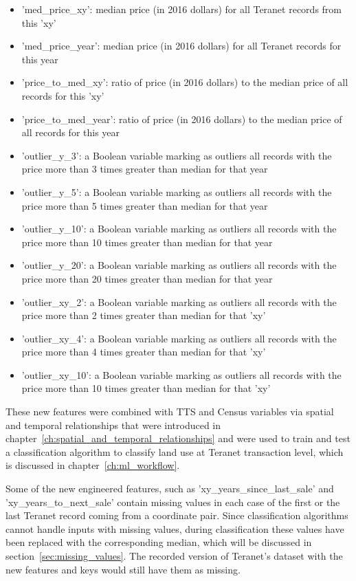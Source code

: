 \begin{itemize}
    \item 'med\_price\_xy': median price (in 2016 dollars) for all Teranet records from this 'xy'
    \item 'med\_price\_year': median price (in 2016 dollars) for all Teranet records for this year
    \item 'price\_to\_med\_xy': ratio of price (in 2016 dollars) to the median price of all records for this 'xy'
    \item 'price\_to\_med\_year': ratio of price (in 2016 dollars) to the median price of all records for this year
    \item 'outlier\_y\_3': a Boolean variable marking as outliers all records with the price more than 3 times greater than median for that year
    \item 'outlier\_y\_5': a Boolean variable marking as outliers all records with the price more than 5 times greater than median for that year
    \item 'outlier\_y\_10': a Boolean variable marking as outliers all records with the price more than 10 times greater than median for that year
    \item 'outlier\_y\_20': a Boolean variable marking as outliers all records with the price more than 20 times greater than median for that year
    \item 'outlier\_xy\_2': a Boolean variable marking as outliers all records with the price more than 2 times greater than median for that 'xy'
    \item 'outlier\_xy\_4': a Boolean variable marking as outliers all records with the price more than 4 times greater than median for that 'xy'
    \item 'outlier\_xy\_10': a Boolean variable marking as outliers all records with the price more than 10 times greater than median for that 'xy'
\end{itemize}

These new features were combined with TTS and Census variables via spatial and temporal relationships that were introduced in chapter~\ref{ch:spatial_and_temporal_relationships} and were used to train and test a classification algorithm to classify land use at Teranet transaction level, which is discussed in chapter~\ref{ch:ml_workflow}.

Some of the new engineered features, such as 'xy\_years\_since\_last\_sale' and 'xy\_years\_to\_next\_sale' contain missing values in each case of the first or the last Teranet record coming from a coordinate pair.
Since classification algorithms cannot handle inputs with missing values, during classification these values have been replaced with the corresponding median, which will be discussed in section~\ref{sec:missing_values}.
The recorded version of Teranet's dataset with the new features and keys would still have them as missing.

